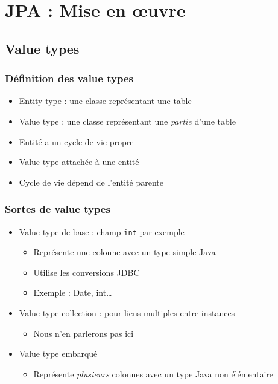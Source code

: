 \documentclass[english, french]{beamer}
\begin{document}
\section{JPA : Mise en œuvre}
\subsection{Value types}
\begin{frame}
	\frametitle{Définition des value types}
	\begin{itemize}
		\item Entity type : une classe représentant une table
		\item Value type : une classe représentant une \emph{partie} d’une table
		\item Entité a un cycle de vie propre
		\item Value type attachée à une entité
		\item Cycle de vie dépend de l’entité parente
	\end{itemize}
\end{frame}

\begin{frame}
	\frametitle{Sortes de value types}
	\begin{itemize}
		\item Value type de base : champ \texttt{int} par exemple
		\begin{itemize}
			\item Représente une colonne avec un type simple Java
			\item Utilise les conversions JDBC
			\item Exemple : Date, int…
		\end{itemize}
		\item Value type collection : pour liens multiples entre instances
		\begin{itemize}
			\item Nous n’en parlerons pas ici
		\end{itemize}
		\item Value type embarqué
		\begin{itemize}
			\item Représente \emph{plusieurs} colonnes avec un type Java non élémentaire
		\end{itemize}
	\end{itemize}
\end{frame}
\end{document}
